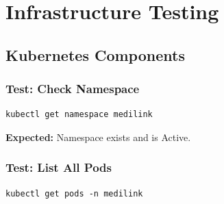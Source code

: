 \documentclass[12pt,a4paper]{article}
\begin{document}
\section{Infrastructure Testing}

\subsection{Kubernetes Components}

\subsubsection{Test: Check Namespace}
\begin{lstlisting}[style=bash]
kubectl get namespace medilink
\end{lstlisting}

\textbf{Expected:} Namespace exists and is Active.

\subsubsection{Test: List All Pods}
\begin{lstlisting}[style=bash]
kubectl get pods -n medilink
\end{lstlisting}
\end{document}
